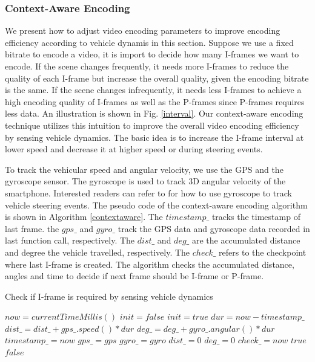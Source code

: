\subsubsection{Context-Aware Encoding}


We present how to adjust video encoding parameters to improve
encoding efficiency according to vehicle dynamis in this section.
Suppose we use a fixed bitrate to encode a video, 
it is import to decide how many I-frames we want to encode. 
If the scene changes frequently, it needs more I-frames to reduce
the quality of each I-frame but increase the overall quality,
given the encoding bitrate is the same. 
If the scene changes infrequently, it needs less I-frames
to achieve a high encoding quality of I-frames 
as well as the P-frames since P-frames requires less data. 
An illustration is shown in Fig. \ref{interval}.
Our context-aware encoding technique utilizes this 
intuition to improve the overall video encoding efficiency
by sensing vehicle dynamics. 
The basic idea is to increase the I-frame interval at lower
speed and decrease it at higher speed or during steering events. 


To track the vehicular speed and angular velocity, we use
the GPS and the gyroscope sensor. 
The gyroscope is used to track 3D angular velocity of the 
smartphone. 
Interested readers can refer to \cite{wang2013sensing, chen2015invisible}
for how to use gyroscope to track vehicle steering events. 
The pseudo code of the context-aware encoding algorithm 
is shown in Algorithm \ref{contextaware}.
The $timestamp\_$ tracks the timestamp of last frame. 
the $gps\_$ and $gyro\_$ track the GPS data and gyroscope data 
recorded in last function call, respectively.
The $dist\_$ and $deg\_$ are the accumulated distance
and degree the vehicle travelled, respectively.
The $check\_$ refers to the checkpoint where last I-frame is created.
The algorithm checks the accumulated distance, angles and time
to decide if next frame should be I-frame or P-frame. 

  \begin{algorithm}[t]
   \caption{Check if I-frame is required by sensing vehicle dynamics}
    \label{contextaware}
    \begin{algorithmic}[1]
  \State $now = currentTimeMillis()$
  \State $init = false$
    \State \Return $init = true$
  \Else
    \State $dur = now - timestamp\_$
    \State $dist\_ = dist\_ + gps\_.speed() * dur$    
    \State $deg\_ = deg\_ + gyro\_.angular() * dur$
  \EndIf
  \State $timestamp\_ = now$
  \State $gps\_ = gps$
  \State $gyro\_ = gyro$
    \State $dist\_ = 0$
    \State $deg\_ = 0$
    \State $check\_ = now$
    \State \Return $true$
  \Else
    \State \Return $false$
  \EndIf
\EndFunction
\end{algorithmic}
\end{algorithm}



